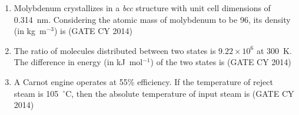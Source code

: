 \documentclass[a4paper,10pt]{exam}
\theoremstyle{remark}
\begin{document}
\begin{enumerate}
\item Molybdenum crystallizes in a \textit{bcc} structure with unit cell dimensions of 0.314~nm. Considering the atomic mass of molybdenum to be 96, its density (in kg~m$^{-3}$) is \underline{\hspace{2cm}}\hfill{(GATE CY 2014)}

\item The ratio of molecules distributed between two states is $9.22 \times 10^6$ at 300~K. The difference in energy (in kJ~mol$^{-1}$) of the two states is \underline{\hspace{2cm}}\hfill{(GATE CY 2014)}

\item A Carnot engine operates at 55\% efficiency. If the temperature of reject steam is 105~$^\circ$C, then the absolute temperature of input steam is \underline{\hspace{2cm}}\hfill{(GATE CY 2014)}


\end{enumerate}
\end{document}

